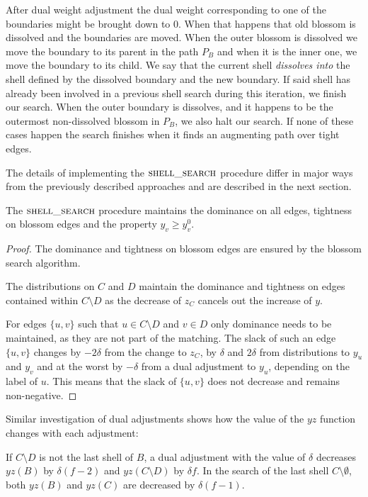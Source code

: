 After dual weight adjustment the dual weight corresponding to one of the boundaries might be brought down to $0$. When that happens that old blossom is dissolved and the boundaries are moved. When the outer blossom is dissolved we move the boundary to its parent in the path $P_B$ and when it is the inner one, we move the boundary to its child. We say that the current shell \textit{dissolves into} the shell defined by the dissolved boundary and the new boundary. If said shell has already been involved in a previous shell search during this iteration, we finish our search. When the outer boundary is dissolves, and it happens to be the outermost non-dissolved blossom in $P_B$, we also halt our search. If none of these cases happen the search finishes when it finds an augmenting path over tight edges.

The details of implementing the $\textsc{shell\_search}$ procedure differ in major ways from the previously described approaches and are described in the next section.

\begin{lemma}\label{lem:search_correctness}
    The $\textsc{shell\_search}$ procedure maintains the dominance on all edges, tightness on blossom edges and the property $y_v \geq y^0_v$.
\end{lemma}

\begin{proof}
    The dominance and tightness on blossom edges are ensured by the blossom search algorithm. 
    
    The distributions on $C$ and $D$ maintain the dominance and tightness on edges contained within $C \setminus D$ as the decrease of $z_C$ cancels out the increase of $y$. 
    
    For edges $\{u, v\}$ such that $u \in C \setminus D$ and $v \in D$ only dominance needs to be maintained, as they are not part of the matching. The slack of such an edge $\{u, v\}$ changes by $-2\delta$ from the change to $z_C$, by $\delta$ and $2\delta$ from distributions to $y_u$ and $y_v$ and at the worst by $-\delta$ from a dual adjustment to $y_u$, depending on the label of $u$. This means that the slack of $\{u, v\}$ does not decrease and remains non-negative.
\end{proof}

Similar investigation of dual adjustments shows how the value of the $yz$ function changes with each adjustment:

\begin{lemma}\label{lem:search_duals}
    If $C \setminus D$ is not the last shell of $B$, a dual adjustment with the value of $\delta$ decreases $yz(B)$ by $\delta(f-2)$ and $yz(C \setminus D)$ by $\delta f$. In the search of the last shell $C \setminus \emptyset$, both $yz(B)$ and $yz(C)$ are decreased by $\delta(f-1)$.
\end{lemma}

